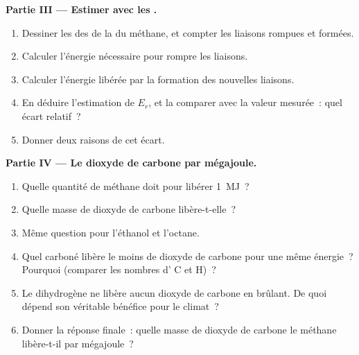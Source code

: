 \begin{problem}
\medskip
\noindent\textbf{Partie III --- Estimer avec les .}
\begin{enumerate}[resume]
  \item Dessiner les  des  de la  du
        méthane, et compter les liaisons rompues et formées.
  \item Calculer l'énergie nécessaire pour rompre les liaisons.
  \item Calculer l'énergie libérée par la formation des nouvelles
        liaisons.
  \item En déduire l'estimation de $E_r$, et la comparer avec la valeur
        mesurée~: quel écart relatif~?
  \item Donner deux raisons de cet écart.
\end{enumerate}

\medskip
\noindent\textbf{Partie IV --- Le dioxyde de carbone par mégajoule.}
\begin{enumerate}[resume]
  \item Quelle quantité de méthane doit  pour libérer \qty{1}{MJ}~?
  \item Quelle masse de dioxyde de carbone libère-t-elle~?
  \item Même question pour l'éthanol et l'octane.
  \item Quel  carboné libère le moins de dioxyde de carbone
        pour une même énergie~? Pourquoi (comparer les nombres d'
        C et H)~?
  \item Le dihydrogène ne libère aucun dioxyde de carbone en brûlant. De
        quoi dépend son véritable bénéfice pour le climat~?
  \item Donner la réponse finale~: quelle masse de dioxyde de carbone le
        méthane libère-t-il par mégajoule~?
\end{enumerate}
\end{problem}

